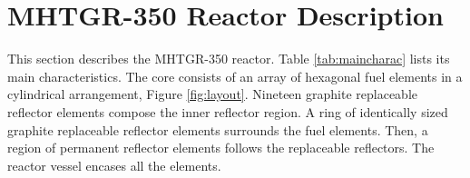 \documentclass[11pt,letterpaper]{article}
\begin{document}




\section{MHTGR-350 Reactor Description}

This section describes the \gls{MHTGR}-350 reactor.
Table \ref{tab:maincharac} lists its main characteristics.
The core consists of an array of hexagonal fuel elements in a cylindrical arrangement, Figure \ref{fig:layout}.
Nineteen graphite replaceable reflector elements compose the inner reflector region.
A ring of identically sized graphite replaceable reflector elements surrounds the fuel elements.
Then, a region of permanent reflector elements follows the replaceable reflectors.
The reactor vessel encases all the elements.
\end{document}
